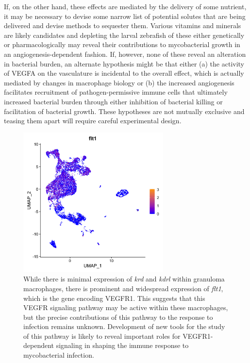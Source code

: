 If, on the other hand, these effects are mediated by the delivery of some nutrient, it may be necessary to devise some narrow list of potential solutes that are being delivered and devise methods to sequester them. Various vitamins and minerals are likely candidates and depleting the larval zebrafish of these either genetically or pharmacologically may reveal their contributions to mycobacterial growth in an angiogenesis\hyp{}dependent fashion. If, however, none of these reveal an alteration in bacterial burden, an alternate hypothesis might be that either (a) the activity of VEGFA on the vasculature is incidental to the overall effect, which is actually mediated by changes in macrophage biology or (b) the increased angiogenesis facilitates recruitment of pathogen\hyp{}permissive immune cells that ultimately increased bacterial burden through either inhibition of bacterial killing or facilitation of bacterial growth. These hypotheses are not mutually exclusive and teasing them apart will require careful experimental design.

\begin{figure}
\centering
\includegraphics[height=3in]{images/wtCombo_flt1_GEPlot.png}
\caption[scRNA\hyp{}seq expression data for \textit{flt1}]{While there is minimal expression of \textit{krd} and \textit{kdrl} within granuloma macrophages, there is prominent and widespread expression of \textit{flt1}, which is the gene encoding VEGFR1. This suggests that this VEGFR signaling pathway may be active within these macrophages, but the precise contributions of this pathway to the response to infection remains unknown. Development of new tools for the study of this pathway is likely to reveal important roles for VEGFR1\hyp{}dependent signaling in shaping the immune response to mycobacterial infection.}
\label{figure:scflt1}
\end{figure}

